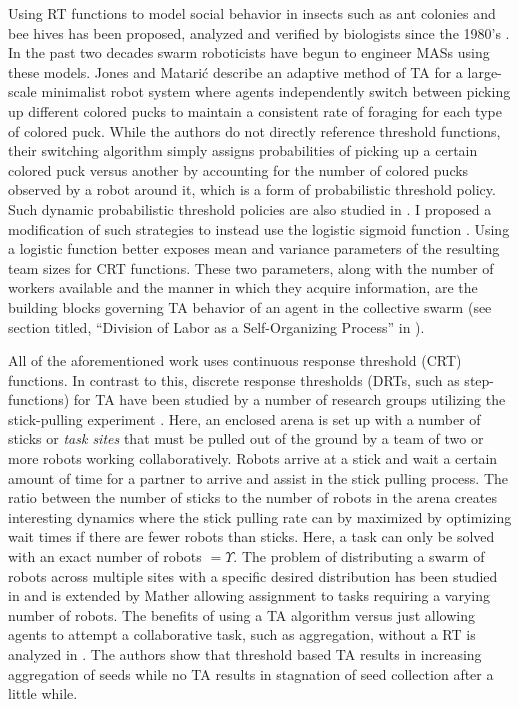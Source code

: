 \documentclass[12pt]{book}
\newcommand{\td}{\Upsilon}   %
\begin{document}
Using RT functions to model social behavior in insects such as ant colonies \cite{Bonabeau1996, Bonabeau1997} and bee hives \cite{Robinson1987, Robinson1992, PageJr1990} has been proposed, analyzed and verified by biologists since the 1980's \cite{Theraulaz1998}. In the past two decades swarm roboticists have begun to engineer MASs using these models. Jones and Matari\'c \cite{Jones2004} describe an adaptive method of TA for a large-scale minimalist robot system where agents independently switch between picking up different colored pucks to maintain a consistent rate of foraging for each type of colored puck. While the authors do not directly reference threshold functions, their switching algorithm simply assigns probabilities of picking up a certain colored puck versus another by accounting for the number of colored pucks observed by a robot around it, which is a form of probabilistic threshold policy. Such dynamic probabilistic threshold policies are also studied in \cite{Nouyan2002}. I proposed a modification of such strategies to instead use the logistic sigmoid function \cite{Kanakia2014}. Using a logistic function better exposes mean and variance parameters of the resulting team sizes for CRT functions. These two parameters, along with the number of workers available and the manner in which they acquire information, are the building blocks governing TA behavior of an agent in the collective swarm (see section titled, ``Division of Labor as a Self-Organizing Process'' in \cite{Robinson1992}).

All of the aforementioned work uses continuous response threshold (CRT) functions. In contrast to this, discrete response thresholds (DRTs, such as step-functions) for TA have been studied by a number of research groups utilizing the stick-pulling experiment \cite{Martinoli1995, Martinoli1998, Lerman2001, Martinoli2004}. Here, an enclosed arena is set up with a number of sticks or \emph{task sites} that must be pulled out of the ground by a team of two or more robots working collaboratively. Robots arrive at a stick and wait a certain amount of time for a partner to arrive and assist in the stick pulling process. The ratio between the number of sticks to the number of robots in the arena creates interesting dynamics where the stick pulling rate can by maximized by optimizing wait times if there are fewer robots than sticks. Here, a task can only be solved with an exact number of robots $= \td$. The problem of distributing a swarm of robots across multiple sites with a specific desired distribution has been studied in \cite{Berman2009, Correll2008} and is extended by Mather \cite{Mather2010} allowing assignment to tasks requiring a varying number of robots. The benefits of using a TA algorithm versus just allowing agents to attempt a collaborative task, such as aggregation, without a RT is analyzed in \cite{Agassounon2001}. The authors show that threshold based TA results in increasing aggregation of seeds while no TA results in stagnation of seed collection after a little while. 
\end{document}
